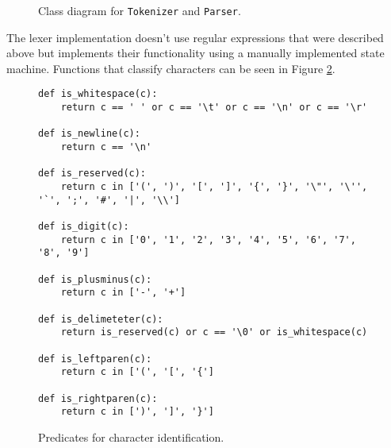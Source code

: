 \begin{figure}[h]
	\centering
\caption{Class diagram for \texttt{Tokenizer} and \texttt{Parser}.}
\label{class-diagram-lexer-parser}
\end{figure}

The lexer implementation doesn't use regular expressions that were described above but implements their functionality using a manually implemented state machine. Functions that classify characters can be seen in Figure \ref{characterpredicates}.

\begin{figure}[h]
\begin{verbatim}
def is_whitespace(c):
    return c == ' ' or c == '\t' or c == '\n' or c == '\r'

def is_newline(c):
    return c == '\n'

def is_reserved(c): 
    return c in ['(', ')', '[', ']', '{', '}', '\"', '\'', '`', ';', '#', '|', '\\']

def is_digit(c):
    return c in ['0', '1', '2', '3', '4', '5', '6', '7', '8', '9']

def is_plusminus(c):
    return c in ['-', '+']

def is_delimeteter(c):
    return is_reserved(c) or c == '\0' or is_whitespace(c)

def is_leftparen(c):
	return c in ['(', '[', '{']

def is_rightparen(c):
	return c in [')', ']', '}']
\end{verbatim}
\caption{Predicates for character identification.}
\label{characterpredicates}
\end{figure}


